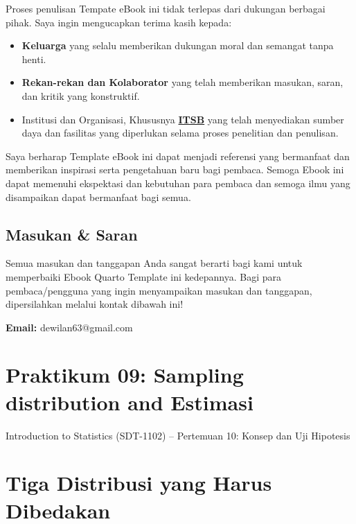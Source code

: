 \documentclass[
  indonesian,
  letterpaper,
]{book}
\providecommand{\tightlist}{%
  \setlength{\itemsep}{0pt}\setlength{\parskip}{0pt}}
\begin{document}
Proses penulisan Tempate eBook ini tidak terlepas dari dukungan berbagai
pihak. Saya ingin mengucapkan terima kasih kepada:

\begin{itemize}
\tightlist
\item
  \textbf{Keluarga} yang selalu memberikan dukungan moral dan semangat
  tanpa henti.
\item
  \textbf{Rekan-rekan dan Kolaborator} yang telah memberikan masukan,
  saran, dan kritik yang konstruktif.
\item
  Institusi dan Organisasi, Khususnya
  \textbf{\href{https://itsb.ac.id/}{ITSB}} yang telah menyediakan
  sumber daya dan fasilitas yang diperlukan selama proses penelitian dan
  penulisan.
\end{itemize}

Saya berharap Template eBook ini dapat menjadi referensi yang bermanfaat
dan memberikan inspirasi serta pengetahuan baru bagi pembaca. Semoga
Ebook ini dapat memenuhi ekspektasi dan kebutuhan para pembaca dan
semoga ilmu yang disampaikan dapat bermanfaat bagi semua.

\section*{Masukan \& Saran}\label{masukan-saran}


Semua masukan dan tanggapan Anda sangat berarti bagi kami untuk
memperbaiki Ebook Quarto Template ini kedepannya. Bagi para
pembaca/pengguna yang ingin menyampaikan masukan dan tanggapan,
dipersilahkan melalui kontak dibawah ini!

\textbf{Email:} dewilan63@gmail.com


\chapter{Praktikum 09: Sampling distribution and
Estimasi}\label{praktikum-09-sampling-distribution-and-estimasi}

Introduction to Statistics (SDT-1102) -- Pertemuan 10: Konsep dan Uji
Hipotesis

\hfill\break


\chapter{Tiga Distribusi yang Harus
Dibedakan}\label{tiga-distribusi-yang-harus-dibedakan}
\end{document}
